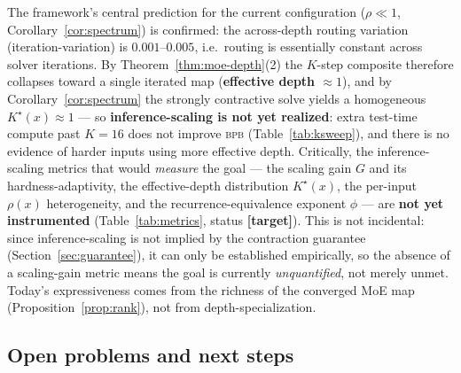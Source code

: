 \documentclass[11pt]{article}
\newcommand{\bpb}{\textsc{bpb}}
\begin{document}
The framework's central prediction for the current configuration ($\rho\ll1$,
Corollary~\ref{cor:spectrum}) is confirmed: the across-depth routing variation (iteration-variation)
is $0.001$--$0.005$, i.e.\ routing is essentially constant across solver iterations.  By
Theorem~\ref{thm:moe-depth}(2) the $K$-step composite therefore collapses toward a single iterated
map (\textbf{effective depth $\approx1$}), and by Corollary~\ref{cor:spectrum} the strongly
contractive solve yields a homogeneous $K^\star(x)\approx1$ --- so \textbf{inference-scaling is not
yet realized}: extra test-time compute past $K\!=\!16$ does not improve \bpb{} (Table~\ref{tab:ksweep}),
and there is no evidence of harder inputs using more effective depth.  Critically, the
inference-scaling metrics that would \emph{measure} the goal --- the scaling gain $G$ and its
hardness-adaptivity, the effective-depth distribution $K^\star(x)$, the per-input $\rho(x)$
heterogeneity, and the recurrence-equivalence exponent $\phi$ --- are \textbf{not yet
instrumented} (Table~\ref{tab:metrics}, status \textbf{[target]}).  This is not incidental: since
inference-scaling is not implied by the contraction guarantee (Section~\ref{sec:guarantee}), it
can only be established empirically, so the absence of a scaling-gain metric means the goal is
currently \emph{unquantified}, not merely unmet.  Today's expressiveness comes from the richness
of the converged MoE map (Proposition~\ref{prop:rank}), not from depth-specialization.

\subsection{Open problems and next steps}
\label{sec:next}
\end{document}
